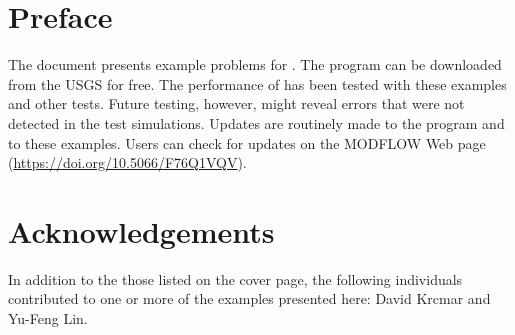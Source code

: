 \newpage
\section*{Preface}
The document presents example problems for \mf.  The \mf program can be downloaded from the USGS for free.  The performance of \mf has been tested with these examples and other tests.  Future testing, however, might reveal errors that were not detected in the test simulations.  Updates are routinely made to the \mf program and to these examples.  Users can check for updates on the MODFLOW Web page (\url{https://doi.org/10.5066/F76Q1VQV}).

\section*{Acknowledgements}
In addition to the those listed on the cover page, the following individuals contributed to one or more of the examples presented here: David Krcmar and Yu-Feng Lin. 

